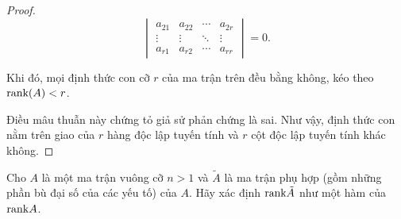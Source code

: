\documentclass[class=nhvh-linear-algebra,crop=false]{standalone}
\begin{document}
\begin{proof}
\[\begin{vmatrix}
            a_{21} & a_{22} & \cdots & a_{2r} \\
            \vdots & \vdots & \ddots & \vdots \\
            a_{r1} & a_{r2} & \cdots & a_{rr}
        \end{vmatrix} = 0.
    \]
    \par Khi đó, mọi định thức con cỡ $r$ của ma trận trên đều bằng không, kéo theo $\text{rank}(A) < r$.
    \par Điều mâu thuẫn này chứng tỏ giả sử phản chứng là sai. Như vậy, định thức con nằm trên giao của $r$ hàng độc lập tuyến tính và $r$ cột độc lập tuyến tính khác không.
\end{proof}

\begin{exercise}
    \par Cho $A$ là một ma trận vuông cỡ $n > 1$ và $\tilde{A}$ là ma trận phụ hợp (gồm những phần bù đại số của các yếu tố) của $A$. Hãy xác định $\text{rank}\tilde{A}$ như một hàm của $\text{rank} A$.
\end{exercise}
\end{document}
